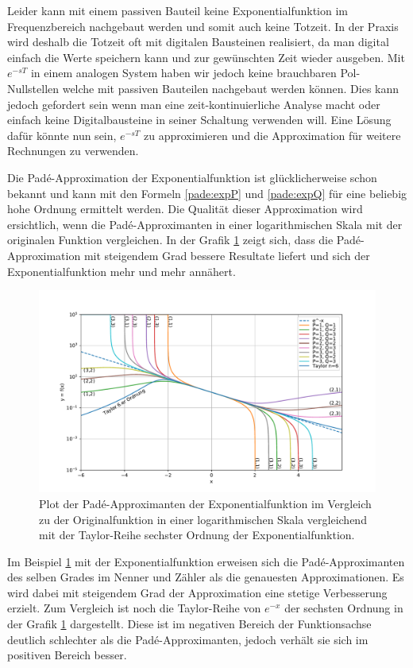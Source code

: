Leider kann mit einem passiven Bauteil keine Exponentialfunktion im Frequenzbereich nachgebaut werden und somit auch keine Totzeit.
In der Praxis wird deshalb die Totzeit oft mit digitalen Bausteinen realisiert, da man digital einfach die Werte speichern kann und zur gewünschten Zeit wieder ausgeben.
Mit $e^{-sT}$ in einem analogen System haben wir jedoch keine brauchbaren Pol- Nullstellen welche mit passiven Bauteilen nachgebaut werden können.  
Dies kann jedoch gefordert sein wenn man eine zeit-kontinuierliche Analyse macht oder einfach keine Digitalbausteine in seiner Schaltung verwenden will.
Eine Lösung dafür könnte nun sein, $e^{-sT}$ zu approximieren und die Approximation für weitere Rechnungen zu verwenden.

Die Padé-Approximation der Exponentialfunktion ist glücklicherweise schon bekannt und kann mit den Formeln \eqref{pade:expP} und \eqref{pade:expQ} für eine beliebig hohe Ordnung ermittelt werden.
Die Qualität dieser Approximation wird ersichtlich, wenn die Padé-Approximanten in einer logarithmischen Skala mit der originalen Funktion vergleichen.
In der Grafik \ref{pade:totzeitexp} zeigt sich, dass die Padé-Approximation mit steigendem Grad bessere Resultate liefert und sich der Exponentialfunktion mehr und mehr annähert.

\begin{figure}[!h]
	\centering
	\includegraphics[width=1\linewidth]{./papers/pade/python/bilder/totzeit.pdf}
	\caption{Plot der Padé-Approximanten der Exponentialfunktion im Vergleich zu der Originalfunktion in einer logarithmischen Skala vergleichend mit der Taylor-Reihe sechster Ordnung der Exponentialfunktion.\label{pade:totzeitexp}}
\end{figure}

Im Beispiel \ref{pade:totzeitexp} mit der Exponentialfunktion erweisen sich die Padé-Approximanten des selben Grades im Nenner und Zähler als die genauesten Approximationen.
Es wird dabei mit steigendem Grad der Approximation eine stetige Verbesserung erzielt.
Zum Vergleich ist noch die Taylor-Reihe von $e^{-x}$ der sechsten Ordnung in der Grafik \ref{pade:totzeitexp} dargestellt. 
Diese ist im negativen Bereich der Funktionsachse deutlich schlechter als die Padé-Approximanten, jedoch verhält sie sich im positiven Bereich besser.


